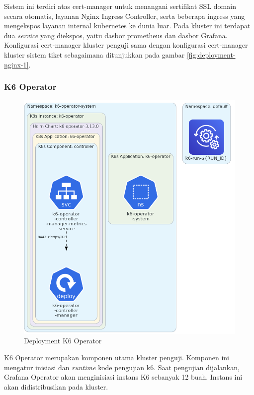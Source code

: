 Sistem ini terdiri atas cert-manager untuk menangani sertifikat SSL domain secara otomatis, layanan Nginx Ingress Controller, serta beberapa ingress yang mengekspos layanan internal kubernetes ke dunia luar. Pada kluster ini terdapat dua \textit{service} yang diekspos, yaitu dasbor prometheus dan dasbor Grafana. Konfigurasi cert-manager kluster penguji sama dengan konfigurasi cert-manager kluster sistem tiket sebagaimana ditunjukkan pada gambar \ref{fig:deployment-nginx-1}.

\pagebreak

\subsubsection{K6 Operator}

\begin{figure}[htbp]
    \centering
    \includegraphics[width=1\textwidth]{resources/chapter-4/k6-operator.png}
    \caption{Deployment K6 Operator}
    \label{fig:deployment-k6-operator}
\end{figure}

K6 Operator merupakan komponen utama kluster penguji. Komponen ini mengatur inisiasi dan \textit{runtime} kode pengujian k6. Saat pengujian dijalankan, Grafana Operator akan menginisiasi instans K6 sebanyak 12 buah. Instans ini akan didistribusikan pada kluster.

\pagebreak
